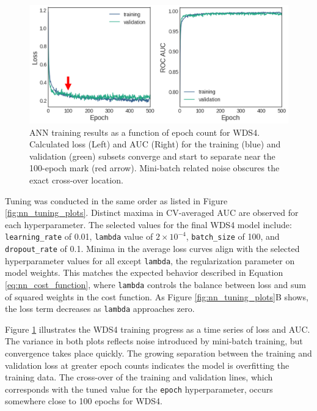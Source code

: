 \begin{figure}[htp]
\centering
\includegraphics[width=\textwidth]{templates/images/Figure-NN-Training-Loss.png}
\caption[Neural network training loss]{ANN training results as a function of epoch count for WDS4. Calculated loss (Left) and AUC (Right) for the training (blue) and validation (green) subsets converge and start to separate near the 100-epoch mark (red arrow). Mini-batch related noise obscures the exact cross-over location.}
\label{fig:nn_loss_plot}
\end{figure}

Tuning was conducted in the same order as listed in Figure \ref{fig:nn_tuning_plots}. Distinct maxima in CV-averaged AUC are observed for each hyperparameter. The selected values for the final WDS4 model include: \verb|learning_rate| of 0.01, \verb|lambda| value of $2\times10^{-4}$, \verb|batch_size| of 100, and \verb|dropout_rate| of 0.1. Minima in the average loss curves align with the selected hyperparameter values for all except \verb|lambda|, the regularization parameter on model weights. This matches the expected behavior described in Equation \ref{eq:nn_cost_function}, where \verb|lambda| controls the balance between loss and sum of squared weights in the cost function. As Figure \ref{fig:nn_tuning_plots}B shows, the loss term decreases as \verb|lambda| approaches zero.

Figure \ref{fig:nn_loss_plot} illustrates the WDS4 training progress as a time series of loss and AUC. The variance in both plots reflects noise introduced by mini-batch training, but convergence takes place quickly. The growing separation between the training and validation loss at greater epoch counts indicates the model is overfitting the training data. The cross-over of the training and validation lines, which corresponds with the tuned value for the \verb|epoch| hyperparameter, occurs somewhere close to 100 epochs for WDS4.

